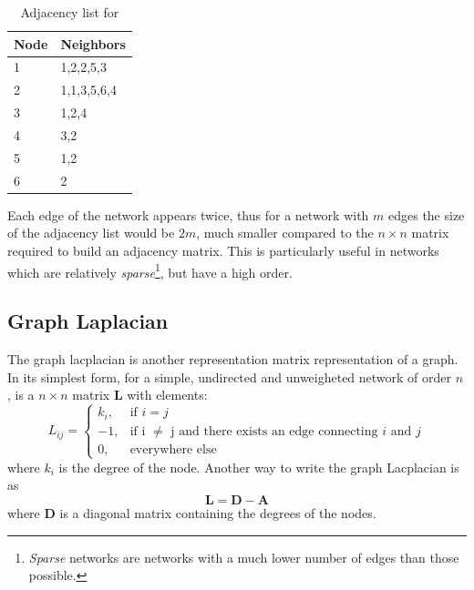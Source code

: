 \begin{table}[H]
  \centering
\begin{tabular}{|l|l|}
\hline
\rowcolor[HTML]{C0C0C0} 
{\color[HTML]{000000} Node} & {\color[HTML]{000000} Neighbors} \\ \hline
1                           & 1,2,2,5,3                        \\ \hline
2                           & 1,1,3,5,6,4                     \\ \hline
3                           & 1,2,4                           \\ \hline
4                           & 3,2                             \\ \hline
5                           & 1,2                             \\ \hline
6                           & 2                                \\ \hline
\end{tabular}
\label{table:adj_list_ex}
\caption{Adjacency list for }
\end{table}
Each edge of the network appears twice, thus for a network with $m$
edges the size of the adjacency list would be $2m$, much smaller
compared to the $n \times n$ matrix required to build an adjacency
matrix. This is particularly useful in networks which are relatively
\textit{sparse}\footnote{\textit{Sparse} networks are networks with a
much lower number of edges than those possible.}, but have a high
order.

\subsection{Graph Laplacian}\label{sec:laplacian}

The graph lacplacian is another representation matrix representation
of a graph. In its simplest form, for a simple, undirected and unweigheted
network of order $n$, is a $n \times n$ matrix \textbf{L} with elements:
\begin{equation*}
  L_{ij} = \begin{cases}k_i, &\text{if $i=j$}\\
             -1, & \text{if i $\neq$ j and there exists an edge connecting $i$ and $j$} \\
             0, & \text{everywhere else}
           \end{cases} 
\end{equation*}
where $k_i$ is the degree of the node. Another way to write the graph Lacplacian
is as
\begin{equation*}
  \textbf{L} = \textbf{D} - \textbf{A}
\end{equation*}
where \textbf{D} is a diagonal matrix containing the degrees of the nodes.

